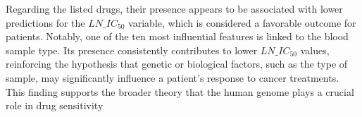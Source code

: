 Regarding the listed drugs, their presence appears to be associated with lower predictions for the \(LN\_IC_{50}\) variable, which is considered a favorable outcome for patients. Notably, one of the ten most influential features is linked to the blood sample type. Its presence consistently contributes to lower \(LN\_IC_{50}\) values, reinforcing the hypothesis that genetic or biological factors, such as the type of sample, may significantly influence a patient's response to cancer treatments. This finding supports the broader theory that the human genome plays a crucial role in drug sensitivity